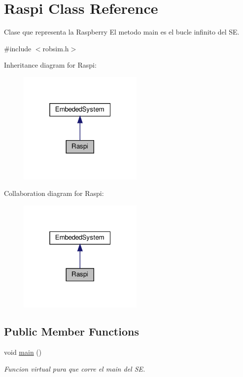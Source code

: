 \hypertarget{classRaspi}{}\section{Raspi Class Reference}
\label{classRaspi}


Clase que representa la Raspberry El metodo main es el bucle infinito del SE.  




{\ttfamily \#include $<$robsim.\+h$>$}



Inheritance diagram for Raspi\+:\nopagebreak
\begin{figure}[H]
\begin{center}
\leavevmode
\includegraphics[width=172pt]{classRaspi__inherit__graph}
\end{center}
\end{figure}


Collaboration diagram for Raspi\+:\nopagebreak
\begin{figure}[H]
\begin{center}
\leavevmode
\includegraphics[width=172pt]{classRaspi__coll__graph}
\end{center}
\end{figure}
\subsection*{Public Member Functions}
\begin{DoxyCompactItemize}
\item 
void \hyperlink{classRaspi_adce86197732891370a63b239cc413c7e}{main} ()
\begin{DoxyCompactList}\small\item\em Funcion virtual pura que corre el main del SE. \end{DoxyCompactList}\end{DoxyCompactItemize}



